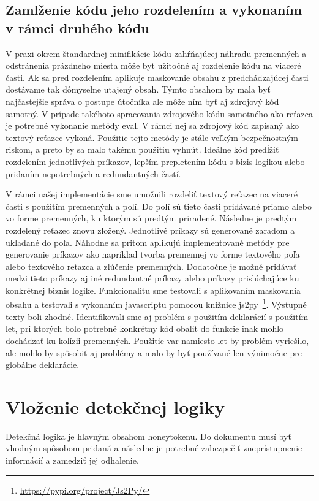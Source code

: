 \documentclass[conference, 11pt,slovak,a4paper,twoside]{IEEEtran}
\begin{document}
\subsection{Zamlženie kódu jeho rozdelením a vykonaním v rámci druhého kódu}

V praxi okrem štandardnej minifikácie kódu zahŕňajúcej náhradu premenných a odstránenia prázdneho miesta môže byť užitočné aj rozdelenie kódu na viaceré časti. Ak sa pred rozdelením aplikuje maskovanie obsahu z predchádzajúcej časti dostávame tak dômyselne utajený obsah. Týmto obsahom by mala byť najčastejšie správa o postupe útočníka ale môže ním byť aj zdrojový kód samotný. V prípade takéhoto spracovania zdrojového kódu samotného ako reťazca je potrebné vykonanie metódy eval. V rámci nej sa zdrojový kód zapísaný ako textový reťazec vykoná. Použitie tejto metódy je stále veľkým bezpečnostným riskom, a preto by sa malo takému použitiu vyhnúť. Ideálne kód predĺžiť rozdelením jednotlivých príkazov, lepším prepletením kódu s bizis logikou alebo pridaním nepotrebných a redundantných častí.

V rámci našej implementácie sme umožnili rozdeliť textový reťazec na viaceré časti s použitím premenných a polí. Do polí sú tieto časti pridávané priamo alebo vo forme premenných, ku ktorým sú predtým priradené. Následne je predtým rozdelený reťazec znovu zložený. Jednotlivé príkazy sú generované zaradom a ukladané do poľa. Náhodne sa pritom aplikujú implementované metódy pre generovanie príkazov ako napríklad tvorba premennej vo forme textového poľa alebo textového reťazca a zlúčenie premenných. Dodatočne je možné pridávať medzi tieto príkazy aj iné redundantné príkazy alebo príkazy prislúchajúce ku konkrétnej biznis logike. Funkcionalitu sme testovali s aplikovaním maskovania obsahu a testovali s vykonaním javascriptu pomocou knižnice js2py~\footnote{\url{https://pypi.org/project/Js2Py/}}. Výstupné texty boli zhodné. Identifikovali sme aj problém s použitím deklarácií s použitím let, pri ktorých bolo potrebné konkrétny kód obaliť do funkcie inak mohlo dochádzať ku kolízii premenných. Použitie var namiesto let by problém vyriešilo, ale mohlo by spôsobiť aj problémy a malo by byť používané len výnimočne pre globálne deklarácie. 


\section{Vloženie detekčnej logiky}

Detekčná logika je hlavným obsahom honeytokenu. Do dokumentu musí byť vhodným spôsobom pridaná a následne je potrebné zabezpečiť zneprístupnenie informácií a zamedziť jej odhalenie.
\end{document}
